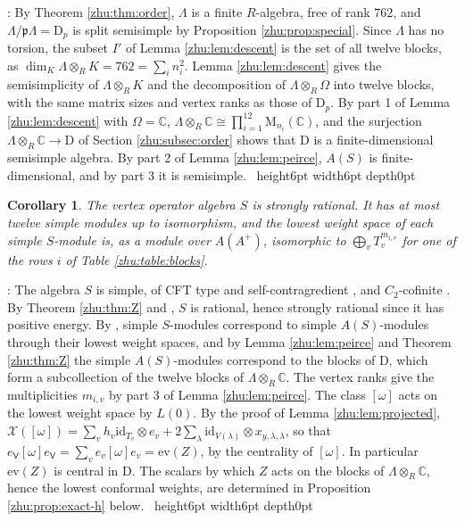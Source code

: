 \documentclass[leqno]{article}
\newcommand{\Cbb}{\ensuremath{\mathbb{C}}}
\newcommand{\D}{\mathrm{D}}
\newcommand{\M}{\mathrm{M}}
\newcommand{\qed}{\hfill \vrule height6pt  width6pt depth0pt}
\newcommand{\ot}{\otimes}
\newtheorem{cor}[thm]{Corollary}
\newenvironment{proof}[1][]{\noindent {\it Proof #1} : }{\hbox{~}\qed
\smallskip
}
\numberwithin{equation}{section}
\begin{document}
\begin{proof}
By Theorem \ref{zhu:thm:order}, $\Lambda$ is a finite $R$-algebra, free of rank $762$, and $\Lambda/\mathfrak p\Lambda = \D_p$ is split semisimple by Proposition \ref{zhu:prop:special}. Since $\Lambda$ has no torsion, the subset $I'$ of Lemma \ref{zhu:lem:descent} is the set of all twelve blocks, as $\dim_K \Lambda \ot_R K = 762 = \sum_i n_i^2$. Lemma \ref{zhu:lem:descent} gives the semisimplicity of $\Lambda \ot_R K$ and the decomposition of $\Lambda \ot_R \Omega$ into twelve blocks, with the same matrix sizes and vertex ranks as those of $\D_p$. By part 1 of Lemma \ref{zhu:lem:descent} with $\Omega = \Cbb$, $\Lambda \ot_R \Cbb \cong \prod_{i=1}^{12} \M_{n_i}(\Cbb)$, and the surjection $\Lambda \ot_R \Cbb \to \D$ of Section \ref{zhu:subsec:order} shows that $\D$ is a finite-dimensional semisimple algebra. By part 2 of Lemma \ref{zhu:lem:peirce}, $A(S)$ is finite-dimensional, and by part 3 it is semisimple.
\end{proof}

\begin{cor}
\label{zhu:cor:rational}
The vertex operator algebra $S$ is strongly rational. It has at most twelve simple modules up to isomorphism, and the lowest weight space of each simple $S$-module is, as a module over $A(A^+)$, isomorphic to $\bigoplus_v T_v^{m_{i,v}}$ for one of the rows $i$ of Table \ref{zhu:table:blocks}.
\end{cor}

\begin{proof}
The algebra $S$ is simple, of CFT type and self-contragredient \cite[Theorem 10.10]{Arh26}, and $C_2$-cofinite \cite[Theorem 10.21]{Arh26}. By Theorem \ref{zhu:thm:Z} and \cite[Corollary 5.19 p.~61]{McR21}, $S$ is rational, hence strongly rational since it has positive energy. By \cite[Theorem 2.2.2 p.~261]{Zhu96}, simple $S$-modules correspond to simple $A(S)$-modules through their lowest weight spaces, and by Lemma \ref{zhu:lem:peirce} and Theorem \ref{zhu:thm:Z} the simple $A(S)$-modules correspond to the blocks of $\D$, which form a subcollection of the twelve blocks of $\Lambda \ot_R \Cbb$. The vertex ranks give the multiplicities $m_{i,v}$ by part 3 of Lemma \ref{zhu:lem:peirce}. The class $[\omega]$ acts on the lowest weight space by $L(0)$. By the proof of Lemma \ref{zhu:lem:projected}, $\mathcal X([\omega]) = \sum_v h_v \mathrm{id}_{T_v} \ot e_v + 2\sum_\lambda \mathrm{id}_{V(\lambda)} \ot x_{y,\lambda,\lambda}$, so that $e_{\mathsf V}[\omega]e_{\mathsf V} = \sum_v e_v [\omega] e_v = \mathrm{ev}(Z)$, by the centrality of $[\omega]$. In particular $\mathrm{ev}(Z)$ is central in $\D$. The scalars by which $Z$ acts on the blocks of $\Lambda \ot_R \Cbb$, hence the lowest conformal weights, are determined in Proposition \ref{zhu:prop:exact-h} below.
\end{proof}
\end{document}

